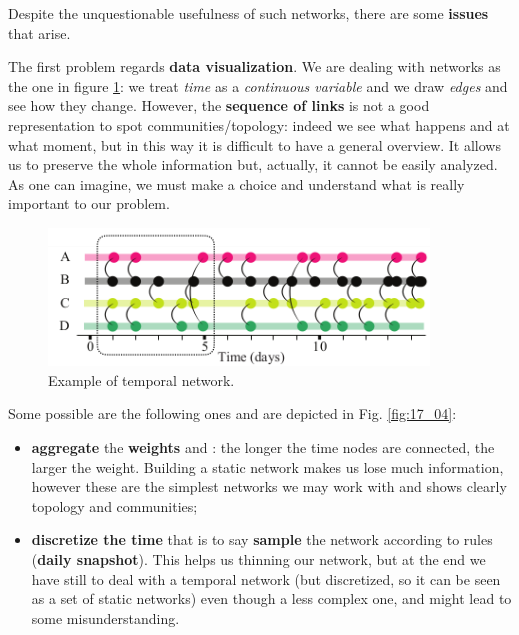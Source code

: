 \documentclass[../main/main.tex]{subfiles}
\begin{document}
Despite the unquestionable usefulness of such networks, there are some \textbf{issues} that arise.

The first problem regards \textbf{data visualization}. We are dealing with networks as the one in figure \ref{fig:17_03}: we treat \textit{time} as a \textit{continuous variable} and we draw \textit{edges} and see how they change. However, the \textbf{sequence of links} is not a good representation to spot communities/topology: indeed we see what happens and at what moment, but in this way it is difficult to have a general overview. It allows us to preserve the whole information but, actually, it cannot be easily analyzed. As one can imagine, we must make a choice and understand what is really important to our problem.


\begin{figure}[h!]
\centering
\includegraphics[width=0.9\textwidth]{../lessons/image/17/image03.png}
\caption{\label{fig:17_03} Example of temporal network. }
\end{figure}


Some possible  are the following ones and are depicted in Fig. \ref{fig:17_04}:
\begin{itemize}
    \item \textbf{aggregate} the \textbf{weights} and : the longer the time nodes are connected, the larger the weight. Building a static network makes us lose much information, however these are the simplest networks we may work with and shows clearly topology and communities;
    \item \textbf{discretize the time} that is to say \textbf{sample} the network according to rules (\textbf{daily snapshot}). This helps us thinning our network, but at the end we have still to deal with a temporal network (but discretized, so it can be seen as a set of static networks) even though a less complex one, and might lead to some misunderstanding.
\end{itemize}
\end{document}

